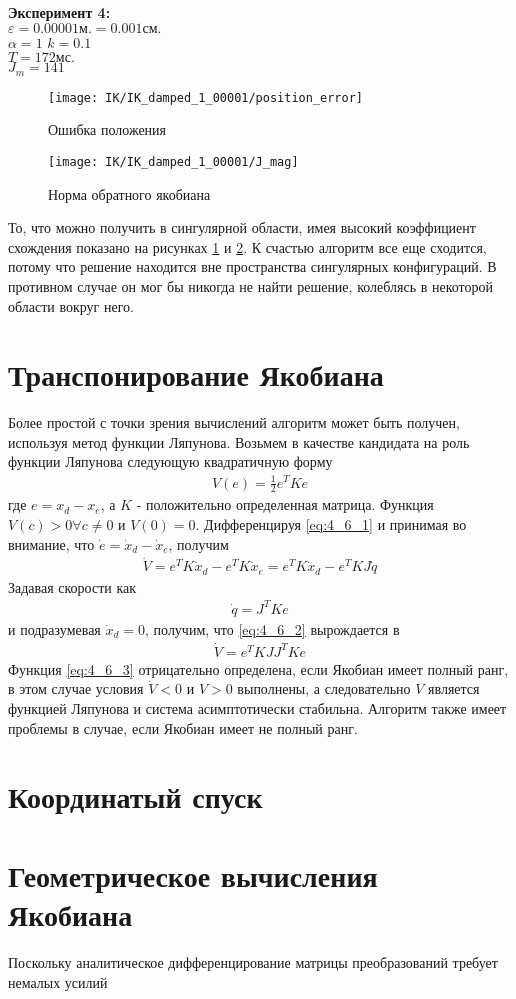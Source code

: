 \textbf{Эксперимент 4:}\\
$\varepsilon = 0.00001\text{м.} = 0.001\text{см.}$\\
$\alpha = 1$
$k = 0.1$\\
$T = 172 \text{мс.}$\\
$J_{m} = 141$

\begin{figure}[h!]
	\centering
	\texttt{[image: IK/IK\_damped\_1\_00001/position\_error]}
	\caption{Ошибка положения}
	\label{fig:4_5_7}
\end{figure}
\begin{figure}[h!]
	\centering
	\texttt{[image: IK/IK\_damped\_1\_00001/J\_mag]}
	\caption{Норма обратного якобиана}
	\label{fig:4_5_8}
\end{figure}
То, что можно получить в сингулярной области, имея высокий коэффициент схождения показано на рисунках \ref{fig:4_5_7} и \ref{fig:4_5_8}. К счастью алгоритм все еще сходится, потому что решение находится вне пространства сингулярных конфигураций. В противном случае он мог бы никогда не найти решение, колеблясь в некоторой области вокруг него.

\section{Транспонирование Якобиана} \label{sect:4_6}
Более простой с точки зрения вычислений алгоритм может быть получен, используя метод функции Ляпунова.\cite{Bruno}
Возьмем в качестве кандидата на роль функции Ляпунова следующую квадратичную форму
\begin{align} \label{eq:4_6_1}
	V(e) = \frac{1}{2}e^{T}Ke
\end{align}
где $e = x_{d} - x_{e}$, а $K$ - положительно определенная матрица. Функция $V(c) > 0 \forall c \neq 0$ и $V(0) = 0$. Дифференцируя \ref{eq:4_6_1} и принимая во внимание, что $\dot{e} = \dot{x}_{d} - \dot{x}_{e}$, получим
\begin{align}\label{eq:4_6_2}
	\dot{V} = e^{T}K\dot{x}_{d} - e^{T}K\dot{x}_{e} = e^{T}K\dot{x}_{d} - e^{T}KJ\dot{q}
\end{align}
Задавая скорости как
\begin{align*}
	\dot{q} = J^{T}Ke
\end{align*}
и подразумевая $\dot{x}_{d} = 0$, получим, что \ref{eq:4_6_2} вырождается в 
\begin{align} \label{eq:4_6_3}
	\dot{V} = e^{T}KJJ^{T}Ke
\end{align}
Функция \ref{eq:4_6_3} отрицательно определена, если Якобиан имеет полный ранг, в этом случае условия $\dot{V} < 0$ и $V > 0$ выполнены, а следовательно $V$ является функцией Ляпунова и система асимптотически стабильна. Алгоритм также имеет проблемы в случае, если Якобиан имеет не полный ранг.

\section{Координатый спуск} \label{sect:4_7}

\section{Геометрическое вычисления Якобиана}
Поскольку аналитическое дифференцирование матрицы преобразований требует немалых усилий
